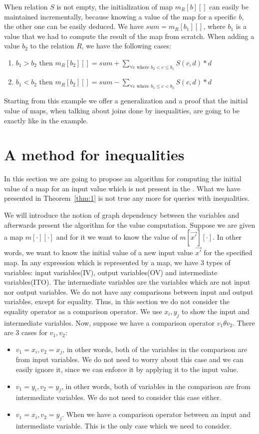\documentclass[12pt]{article}
\begin{document}
When relation $S$ is not empty, the initialization of map $m_R[b][]$ can easily be maintained incrementally, because knowing a value of the map for a specific $b$, the other one can be easily deduced. We have $sum=m_R[b_{1}][]$, where $b_{1}$ is a value that we had to compute the result of the map from scratch. When adding a value $b_{2}$ to the relation $R$, we have the following cases:

\begin{enumerate}
\item $b_{1}>b_{2}$ then $m_R[b_{2}][]=sum + \sum_{\forall\mbox{c where }b_{2}<c\leq b_{1}} S(c,d)*d$
\item $b_{1}<b_{2}$ then $m_R[b_{2}][]=sum - \sum_{\forall\mbox{c where }b_{1}\leq c<b_{2}} S(c,d)*d$
\end{enumerate}

Starting from this example we offer a generalization and a proof that the initial value of maps, when talking about joins done by inequalities, are going to be exactly like in the example.

\section{A method for inequalities}
In this section we are going to propose an algorithm for computing the initial value of a map for an input value which is not present in the \dom{}. What we have presented in Theorem~\ref{thm:1} is not true any more for queries with inequalities. %

We will introduce the notion of graph dependency between the variables and afterwards present the algorithm for the value computation. Suppose we are given a map $m[\cdot][\cdot]$ and for it we want to know the value of $m[\vec{x'}][\cdot]$. In other words, we want to know the initial value of a new input value $\vec{x'}$ for the specified map. In any expression which is represented by a map, we have 3 types of variables: input variables(IV), output variables(OV) and intermediate variables(ITO). The intermediate variables are the variables which are not input nor output variables. 
We do not have any comparisons between input and output variables, except for equality. Thus, in this section we do not consider the equality operator as a comparison operator. 
We use $x_{i}, y_{j}$ to show the input and intermediate variables. Now, suppose we have a comparison operator $v_{1}\theta v_{2}$. There are 3 cases for $v_{1},v_{2}$: 
\begin{itemize}
\item $v_{1}=x_{i}, v_{2}=x_{j}$, in other words, both of the variables in the comparison are from input variables. We do not need to worry about this case and we can easily ignore it, since we can enforce it by applying it to the input value.
\item $v_{1}=y_{i}, v_{2}=y_{j}$, in other words, both of variables in the comparison are from intermediate variables. We do not need to consider this case either. 
\item $v_{1}=x_{i}, v_{2}=y_{j}$. When we have a comparison operator between an input and intermediate variable. This is the only case which we need to consider. 
\end{itemize}
\end{document}
